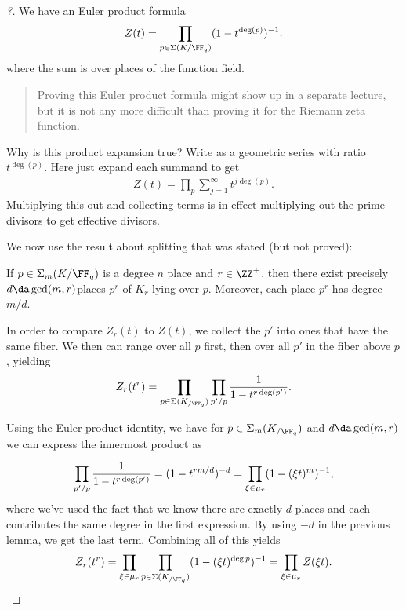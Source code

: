 \begin{proof}[?]

We have an Euler product formula
\begin{align*}  
Z(t) = \prod_{p\in \Sigma(K/\FF_q)} (1 - t^{\deg(p)})^{-1} 
.\end{align*} where the sum is over places of the function field.

\begin{quote}
Proving this Euler product formula might show up in a separate lecture,
but it is not any more difficult than proving it for the Riemann zeta
function.
\end{quote}

\begin{exercise}[?]

Why is this product expansion true? Write as a geometric series with
ratio \(t^{\deg(p)}\). Here just expand each summand to get
\begin{align*}  
Z(t) = \prod_p \sum_{j=1}^\infty t^{j\deg(p)}
.\end{align*} Multiplying this out and collecting terms is in effect
multiplying out the prime divisors to get effective divisors.

\end{exercise}

We now use the result about splitting that was stated (but not proved):

\begin{claim}

If \(p\in \Sigma_m(K/\FF_q)\) is a degree \(n\) place and
\(r\in \ZZ^+\), then there exist precisely \(d\da \gcd(m, r)\)places
\(p^r\) of \(K_r\) lying over \(p\). Moreover, each place \(p^r\) has
degree \(m/d\).

\end{claim}

In order to compare \(Z_r(t)\) to \(Z(t)\), we collect the \(p'\) into
ones that have the same fiber. We then can range over all \(p\) first,
then over all \(p'\) in the fiber above \(p\), yielding
\begin{align*}  
Z_r(t^r) = \prod_{p\in \Sigma(K_{/\FF_q})} \prod_{p'/p} {1 \over 1 - t^{r\deg(p')}}
.\end{align*}

Using the Euler product identity, we have for
\(p\in \Sigma_m(K_{/\FF_q})\) and \(d\da \gcd(m, r)\) we can express the
innermost product as

\begin{align*}  
\prod_{p'/p} {1 \over 1 - t^{r\deg(p')}} = (1 - t^{rm/d})^{-d} = \prod_{\xi\in \mu_r} (1- (\xi t)^m)^{-1}
,\end{align*} where we've used the fact that we know there are exactly
\(d\) places and each contributes the same degree in the first
expression. By using \(-d\) in the previous lemma, we get the last term.
Combining all of this yields
\begin{align*}  
Z_r(t^r) 
= \prod_{\xi \in \mu_r} \prod_{p\in \Sigma(K_{/\FF_q})} (1- (\xi t)^{\deg p})^{-1} 
= \prod_{\xi \in \mu_r} Z(\xi t)
.\end{align*}

\end{proof}

